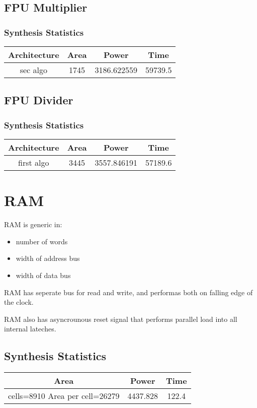 \documentclass[12pt]{report}
\begin{document}
  \subsection{FPU Multiplier}
    \subsubsection{Synthesis Statistics}
    \begin{tabular}{||c|c|c|c||}
      \hline
      Architecture & Area & Power & Time\\\hline\hline
      sec algo & 1745 & 3186.622559 & 59739.5\\\hline
  \end{tabular}

  \subsection{FPU Divider}
    \subsubsection{Synthesis Statistics}
    \begin{tabular}{||c|c|c|c||}
      \hline
      Architecture & Area & Power & Time\\\hline\hline
      first algo & 3445 & 3557.846191 & 57189.6\\\hline
  \end{tabular}

  \section{RAM}
  RAM is generic in:

  \begin{itemize}
    \item number of words
    \item width of address bus
    \item width of data bus
  \end{itemize}

  RAM has seperate bus for read and write, and performas both on falling edge of the clock. 

  RAM also has asyncrounous reset signal that performs parallel load into all internal lateches. 

  \subsection{Synthesis Statistics}
  \begin{tabular}{||c|c|c||}
      \hline
      Area & Power & Time\\\hline\hline
      cells=8910 Area per cell=26279 & 4437.828 & 122.4\\\hline
  \end{tabular}
\end{document}
